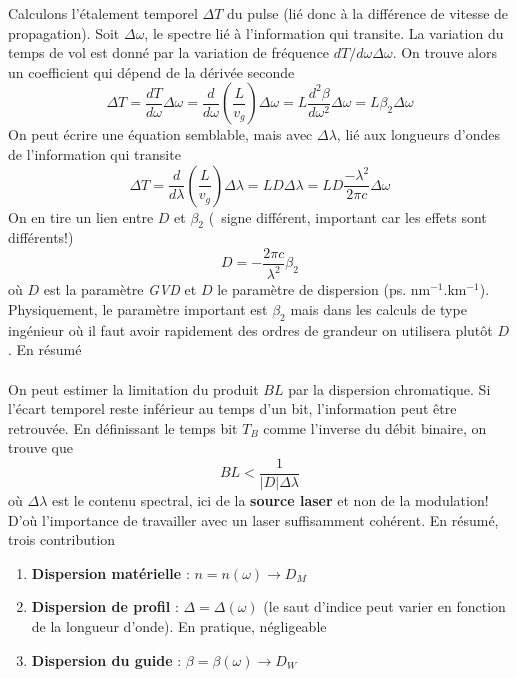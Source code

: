 	Calculons l'étalement temporel $\Delta T$ du pulse (lié donc à la différence de vitesse de 
	propagation). Soit $\Delta \omega$, le spectre lié à l'information qui transite. La variation
	du temps de vol est donné par la variation de fréquence $dT/d\omega\Delta \omega$. On trouve
	alors un coefficient qui dépend de la dérivée seconde
	\begin{equation}
\Delta T = \frac{{dT}}{{d\omega }}\Delta \omega  = \frac{d}{{d\omega }}\left( {\frac{L}{{{v_g}}}} \right)\Delta \omega  = L\frac{{{d^2}\beta }}{{d{\omega ^2}}}\Delta \omega  = L{\beta _2}\Delta \omega 
	\end{equation}
	On peut écrire une équation semblable, mais avec $\Delta \lambda$, lié aux longueurs d'ondes de
	l'information qui transite
	\begin{equation}
\Delta T = \frac{d}{{d\lambda }}\left( {\frac{L}{{{v_g}}}} \right)\Delta \lambda  = LD\Delta \lambda  = LD\frac{{ - {\lambda ^2}}}{{2\pi c}}\Delta \omega 
	\end{equation}
	On en tire un lien entre $D$ et $\beta_2$ (\danger\ signe différent, important car les effets
	sont différents!)
	\begin{equation}
D =  - \frac{{2\pi c}}{{{\lambda ^2}}}{\beta _2}
	\end{equation}
	où $D$ est la paramètre \textit{GVD} et $D$ le paramètre de dispersion (ps. nm$^{-1}$.km$^{-1}$).
	Physiquement, le paramètre important est $\beta_2$ mais dans les calculs de type ingénieur où il
	faut avoir rapidement des ordres de grandeur on utilisera plutôt $D$. En résumé\\
	
	\ \\
	
	On peut estimer la limitation du produit $BL$ par la dispersion chromatique. Si l'écart temporel
	reste inférieur au temps d'un bit, l'information peut être retrouvée. En définissant le temps
	bit $T_B$ comme l'inverse du débit binaire, on trouve que
	\begin{equation}
BL < \frac{1}{{\left| D \right|\Delta \lambda }}
	\end{equation}
	où $\Delta \lambda$ est le contenu spectral, ici de la \textbf{source laser} et non de la 
	modulation! D'où l'importance de travailler avec un laser suffisamment cohérent. En résumé, 
	trois contribution
	\begin{enumerate}
	\item \textbf{Dispersion matérielle} : $n=n(\omega)\to D_M$
	\item \textbf{Dispersion de profil} : $\Delta=\Delta(\omega)$ (le saut d'indice peut varier
	en fonction de la longueur d'onde). En pratique, négligeable
	\item \textbf{Dispersion du guide} : $\beta=\beta(\omega)\to D_W$	
	\end{enumerate}


